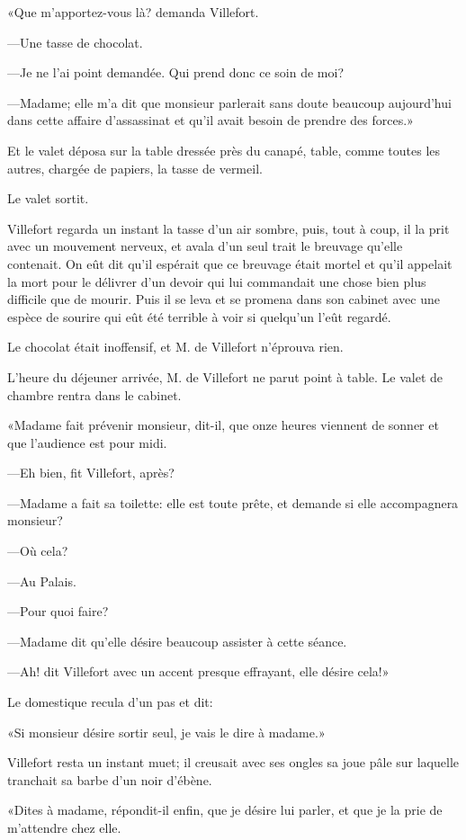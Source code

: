 «Que m'apportez-vous là? demanda Villefort. 

—Une tasse de chocolat. 

—Je ne l'ai point demandée. Qui prend donc ce soin de moi? 

—Madame; elle m'a dit que monsieur parlerait sans doute beaucoup aujourd'hui dans cette affaire d'assassinat et qu'il avait besoin de prendre des forces.» 

Et le valet déposa sur la table dressée près du canapé, table, comme toutes les autres, chargée de papiers, la tasse de vermeil. 

Le valet sortit. 

Villefort regarda un instant la tasse d'un air sombre, puis, tout à coup, il la prit avec un mouvement nerveux, et avala d'un seul trait le breuvage qu'elle contenait. On eût dit qu'il espérait que ce breuvage était mortel et qu'il appelait la mort pour le délivrer d'un devoir qui lui commandait une chose bien plus difficile que de mourir. Puis il se leva et se promena dans son cabinet avec une espèce de sourire qui eût été terrible à voir si quelqu'un l'eût regardé. 

Le chocolat était inoffensif, et M. de Villefort n'éprouva rien. 

L'heure du déjeuner arrivée, M. de Villefort ne parut point à table. Le valet de chambre rentra dans le cabinet. 

«Madame fait prévenir monsieur, dit-il, que onze heures viennent de sonner et que l'audience est pour midi. 

—Eh bien, fit Villefort, après? 

—Madame a fait sa toilette: elle est toute prête, et demande si elle accompagnera monsieur? 

—Où cela? 

—Au Palais. 

—Pour quoi faire? 

—Madame dit qu'elle désire beaucoup assister à cette séance. 

—Ah! dit Villefort avec un accent presque effrayant, elle désire cela!» 

Le domestique recula d'un pas et dit: 

«Si monsieur désire sortir seul, je vais le dire à madame.» 

Villefort resta un instant muet; il creusait avec ses ongles sa joue pâle sur laquelle tranchait sa barbe d'un noir d'ébène. 

«Dites à madame, répondit-il enfin, que je désire lui parler, et que je la prie de m'attendre chez elle. 

